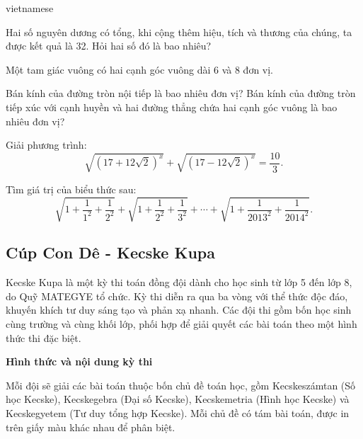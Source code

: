 \documentclass{article}
\begin{document}
\begin{otherlanguage*}{vietnamese}
\begin{problem*}
    Hai số nguyên dương có tổng, khi cộng thêm hiệu, tích và thương của chúng, ta được kết quả là 32. Hỏi hai số đó là bao nhiêu?
\end{problem*}

\begin{problem*}
    Một tam giác vuông có hai cạnh góc vuông dài 6 và 8 đơn vị.
    \begin{enumerate}[topsep=0pt, partopsep=0pt, itemsep=0pt]
        \ii Bán kính của đường tròn nội tiếp là bao nhiêu đơn vị?
        \ii Bán kính của đường tròn tiếp xúc với cạnh huyền và hai đường thẳng chứa hai cạnh góc vuông là bao nhiêu đơn vị?
    \end{enumerate}
\end{problem*}

\begin{problem*}
    Giải phương trình: 
    \[
        \sqrt{\left(17+12\sqrt{2}\right)^x} + \sqrt{\left(17-12\sqrt{2}\right)^x} = \frac{10}{3}.
    \]
\end{problem*}

\begin{problem*}
    Tìm giá trị của biểu thức sau: 
    \[
        \sqrt{1+\frac{1}{1^2}+\frac{1}{2^2}} + \sqrt{1+\frac{1}{2^2}+\frac{1}{3^2}} + \cdots + \sqrt{1+\frac{1}{2013^2}+\frac{1}{2014^2}}.
    \]
\end{problem*}

\newpage

\subsection{Cúp Con Dê - Kecske Kupa}

Kecske Kupa là một kỳ thi toán đồng đội dành cho học sinh từ lớp 5 đến lớp 8, do Quỹ MATEGYE tổ chức.
Kỳ thi diễn ra qua ba vòng với thể thức độc đáo, khuyến khích tư duy sáng tạo và phản xạ nhanh.
Các đội thi gồm bốn học sinh cùng trường và cùng khối lớp, phối hợp để giải quyết các bài toán theo một hình thức thi đặc biệt.

\textbf{Hình thức và nội dung kỳ thi}

Mỗi đội sẽ giải các bài toán thuộc bốn chủ đề toán học, gồm Kecskeszámtan (Số học Kecske), Kecskegebra (Đại số Kecske),
Kecskemetria (Hình học Kecske) và Kecskegyetem (Tư duy tổng hợp Kecske). Mỗi chủ đề có tám bài toán, được in trên giấy màu khác nhau để phân biệt.


\end{otherlanguage*}
\end{document}
